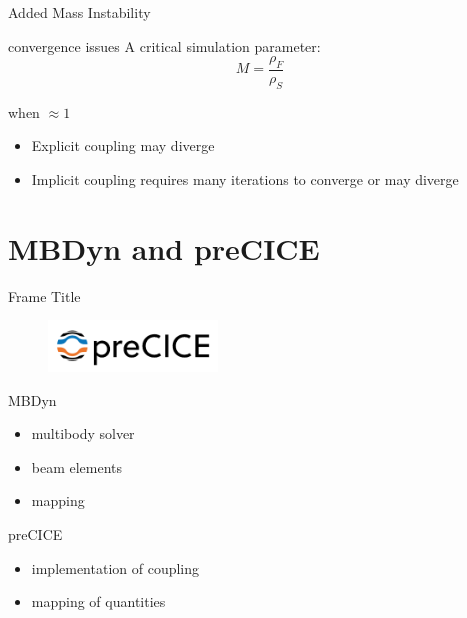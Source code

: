 \documentclass[10pt,t]{beamer}
\begin{document}
\begin{frame}{Added Mass Instability}

\begin{alertblock}{convergence issues}
A critical simulation parameter:
\begin{equation}
    M = \frac{\rho_F}{\rho_S}
\end{equation}

when $\approx 1$

\end{alertblock}

    \begin{itemize}
        \item Explicit coupling may diverge
        \item Implicit coupling requires many iterations to converge or may diverge 
    \end{itemize}
\end{frame}


\section{MBDyn and preCICE}

\begin{frame}{Frame Title}


\begin{figure}
    \centering
    \includegraphics[width=0.4\textwidth]{images/precice.png}
\end{figure}

\begin{figure}
    \centering
    
\end{figure}

\end{frame}


\begin{frame}{MBDyn}
    
    \begin{itemize}
        \item multibody solver
        \item beam elements
        \item mapping
    \end{itemize}
\end{frame}

\begin{frame}{preCICE}
    \begin{itemize}
        \item implementation of coupling
        \item mapping of quantities
    \end{itemize}
\end{frame}
\end{document}
